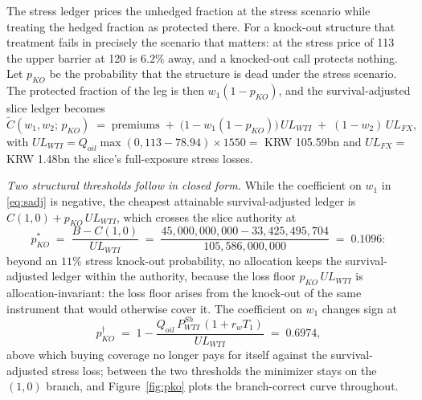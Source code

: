 \documentclass[11pt,a4paper]{article}
\begin{document}
The stress ledger prices the unhedged fraction at the stress scenario while treating the hedged fraction as protected there. For a knock-out structure that treatment fails in precisely the scenario that matters: at the stress price of 113 the upper barrier at 120 is $6.2\%$ away, and a knocked-out call protects nothing. Let $p_{KO}$ be the probability that the structure is dead under the stress scenario. The protected fraction of the leg is then $w_1(1-p_{KO})$, and the survival-adjusted slice ledger becomes
\begin{equation}
\widetilde C(w_1,w_2;\,p_{KO}) \;=\; \text{premiums} \;+\; \bigl(1-w_1(1-p_{KO})\bigr)\,UL_{WTI} \;+\; (1-w_2)\,UL_{FX},
\label{eq:sadj}
\end{equation}
with $UL_{WTI}=Q_{oil}\max(0,113-78.94)\times1550=$ KRW 105.59bn and $UL_{FX}=$ KRW 1.48bn the slice's full-exposure stress losses.

\emph{Two structural thresholds follow in closed form.} While the coefficient on $w_1$ in \eqref{eq:sadj} is negative, the cheapest attainable survival-adjusted ledger is $C(1,0)+p_{KO}\,UL_{WTI}$, which crosses the slice authority at
\begin{equation}
p_{KO}^* \;=\; \frac{B - C(1,0)}{UL_{WTI}} \;=\; \frac{45{,}000{,}000{,}000 - 33{,}425{,}495{,}704}{105{,}586{,}000{,}000} \;=\; 0.1096 :
\label{eq:pstar}
\end{equation}
beyond an $11\%$ stress knock-out probability, no allocation keeps the survival-adjusted ledger within the authority, because the loss floor $p_{KO}\,UL_{WTI}$ is allocation-invariant: the loss floor arises from the knock-out of the same instrument that would otherwise cover it. The coefficient on $w_1$ changes sign at
\begin{equation}
p_{KO}^{\dagger} \;=\; 1-\frac{Q_{oil}\,P^{Sh}_{WTI}\,(1+r_wT_1)}{UL_{WTI}} \;=\; 0.6974,
\label{eq:pdagger}
\end{equation}
above which buying coverage no longer pays for itself against the survival-adjusted stress loss; between the two thresholds the minimizer stays on the $(1,0)$ branch, and Figure~\ref{fig:pko} plots the branch-correct curve throughout.
\end{document}
